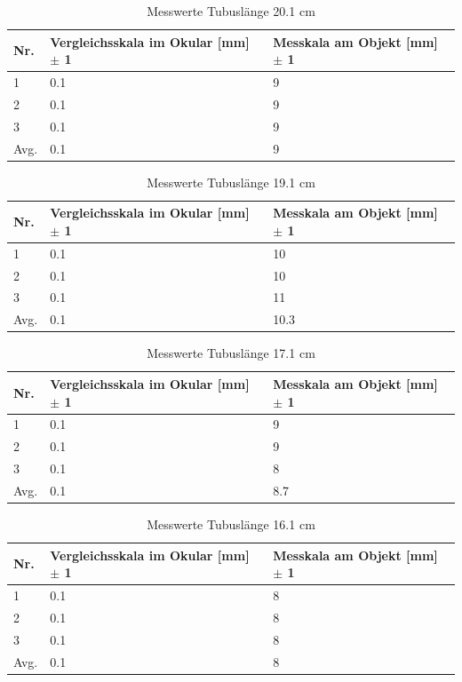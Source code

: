 \documentclass[12pt,a4paper,twoside]{article}
\begin{document}
\begin{table}[H]
    \centering
    \caption{Messwerte Tubuslänge 20.1 cm}
    \label{tab:10XmesswerteTB20}
    \begin{tabular}{| l | l | l |}
        \hline
        Nr.   & Vergleichsskala im Okular [mm] $\pm$ 1 & Messkala am Objekt [mm] $\pm$ 1 \\
        \hline
        1 & 0.1 & 9 \\
        2 & 0.1 & 9 \\
        3 & 0.1 & 9 \\
        \hline
        Avg. & 0.1 & 9 \\
        \hline
    \end{tabular}
\end{table}

\begin{table}[H]
    \centering
    \caption{Messwerte Tubuslänge 19.1 cm}
    \label{tab:10XmesswerteTB19}
    \begin{tabular}{| l | l | l |}
        \hline
        Nr.   & Vergleichsskala im Okular [mm] $\pm$ 1 & Messkala am Objekt [mm] $\pm$ 1 \\
        \hline
        1 & 0.1 & 10 \\
        2 & 0.1 & 10 \\
        3 & 0.1 & 11 \\
        \hline
        Avg. & 0.1 & 10.3 \\
        \hline
    \end{tabular}
\end{table}

\begin{table}[H]
    \centering
    \caption{Messwerte Tubuslänge 17.1 cm}
    \label{tab:10XmesswerteTB17}
    \begin{tabular}{| l | l | l |}
        \hline
        Nr.   & Vergleichsskala im Okular [mm] $\pm$ 1 & Messkala am Objekt [mm] $\pm$ 1 \\
        \hline
        1 & 0.1 & 9 \\
        2 & 0.1 & 9 \\
        3 & 0.1 & 8 \\
        \hline
        Avg. & 0.1 & 8.7 \\
        \hline
    \end{tabular}
\end{table}

\begin{table}[H]
    \centering
    \caption{Messwerte Tubuslänge 16.1 cm}
    \label{tab:10XmesswerteTB16}
    \begin{tabular}{| l | l | l |}
        \hline
        Nr.   & Vergleichsskala im Okular [mm] $\pm$ 1 & Messkala am Objekt [mm] $\pm$ 1 \\
        \hline
        1 & 0.1 & 8 \\
        2 & 0.1 & 8 \\
        3 & 0.1 & 8 \\
        \hline
        Avg. & 0.1 & 8 \\
        \hline
    \end{tabular}
\end{table}
\end{document}
